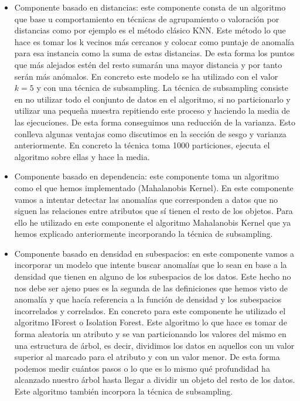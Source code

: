 \begin{itemize}
	\item Componente basado en distancias: este componente consta de un algoritmo que base u comportamiento en técnicas de agrupamiento o valoración por distancias como por ejemplo es el método clásico KNN. Este método lo que hace es tomar los k vecinos más cercanos y colocar como puntaje de anomalía para esa instancia como la suma de estas distancias. De esta forma los puntos que más alejados estén del resto sumarán una mayor distancia y por tanto serán más anómalos. En concreto este modelo se ha utilizado con el valor $k=5$ y con una técnica de subsampling. La técnica de subsampling consiste en no utilizar todo el conjunto de datos en el algoritmo, si no particionarlo y utilizar una pequeña muestra repitiendo este proceso y haciendo la media de las ejecuciones. De esta forma conseguimos una reducción de la varianza. Esto conlleva algunas ventajas como discutimos en la sección de sesgo y varianza anteriormente. En concreto la técnica toma 1000 particiones, ejecuta el algoritmo sobre ellas y hace la media.
	\item Componente basado en dependencia: este componente toma un algoritmo como el que hemos implementado (Mahalanobis Kernel). En este componente vamos a intentar detectar las anomalías que corresponden a datos que no siguen las relaciones entre atributos que sí tienen el resto de los objetos. Para ello he utilizado en este componente el algoritmo Mahalanobis Kernel que ya hemos explicado anteriormente incorporando la técnica de subsampling.
	\item Componente basado en densidad en subespacios: en este componente vamos a incorporar un modelo que intente buscar anomalías que lo sean en base a la densidad que tienen en alguno de los subespacios de los datos. Este hecho no nos debe ser ajeno pues es la segunda de las definiciones que hemos visto de anomalía y que hacía referencia a la función de densidad y los subespacios incorrelados y correlados. En concreto para este componente he utilizado el algoritmo IForest o Isolation Forest. Este algoritmo lo que hace es tomar de forma aleatoria un atributo y se van particionando los valores del mismo en una estructura de árbol, es decir, dividimos los datos en aquellos con un valor superior al marcado para el atributo y con un valor menor. De esta forma podemos medir cuántos pasos o lo que es lo mismo qué profundidad ha alcanzado nuestro árbol hasta llegar a dividir un objeto del resto de los datos. Este algoritmo también incorpora la técnica de subsampling.
\end{itemize}

